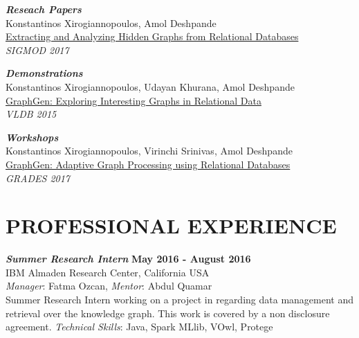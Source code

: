 \documentclass[margin, 10pt]{res} %
\begin{document}
\begin{resume}
{\sl \textbf{Reseach Papers}}\\
  Konstantinos Xirogiannopoulos, Amol Deshpande\\
  \href{http://dl.acm.org/citation.cfm?id=3035949&CFID=937771402&CFTOKEN=20992371}{Extracting and Analyzing Hidden Graphs from Relational Databases}\\
  \textit{SIGMOD 2017}

{\sl \textbf{Demonstrations}}\\
  Konstantinos Xirogiannopoulos, Udayan Khurana, Amol Deshpande\\
  \href{http://www.vldb.org/pvldb/vol8/p2032-xirogiannopoulos.pdf}{GraphGen: Exploring Interesting Graphs in Relational Data}\\
  \textit{VLDB 2015}

  {\sl \textbf{Workshops}}\\
  Konstantinos Xirogiannopoulos, Virinchi Srinivas, Amol Deshpande\\
  \href{https://event.cwi.nl/grades/2017/09-Xirogiannopoulos.pdf}{GraphGen: Adaptive Graph Processing using Relational Databases}\\
  \textit{GRADES 2017}


\section{PROFESSIONAL EXPERIENCE}


{\sl \textbf{Summer Research Intern} } \hfill \textbf{May 2016 - August 2016}\\
IBM Almaden Research Center, California USA\\
\textit{Manager}: Fatma Ozcan, \textit{Mentor}: Abdul Quamar\\
Summer Research Intern working on a project in regarding data management and retrieval over  the knowledge graph. This work is covered by a non disclosure agreement.
\textit{Technical Skills}: Java, Spark MLlib, VOwl, Protege


\end{resume}
\end{document}
